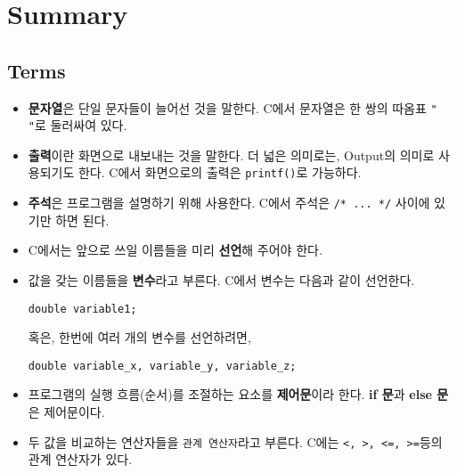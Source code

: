 \documentclass[../main.tex]{subfiles}
\begin{document}
\section{Summary}
\subsection{Terms}
\begin{itemize}
\item \textbf{문자열}은 단일 문자들이 늘어선 것을 말한다. C에서
  문자열은 한 쌍의 따옴표 \texttt{" "}로 둘러싸여 있다.
\item \textbf{출력}이란 화면으로 내보내는 것을 말한다. 더 넓은
  의미로는, Output의 의미로 사용되기도 한다. C에서 화면으로의 출력은
  \texttt{printf()}로 가능하다.
\item \textbf{주석}은 프로그램을 설명하기 위해 사용한다. C에서 주석은
  \texttt{/* ... */} 사이에 있기만 하면 된다.
\item C에서는 앞으로 쓰일 이름들을 미리 \textbf{선언}해 주어야 한다.
\item 값을 갖는 이름들을 \textbf{변수}라고 부른다. C에서 변수는 다음과
  같이 선언한다.
\begin{verbatim}
double variable1;
\end{verbatim}
  혹은, 한번에 여러 개의 변수를 선언하려면,
\begin{verbatim}
double variable_x, variable_y, variable_z;
\end{verbatim}
\item 프로그램의 실행 흐름(순서)를 조절하는 요소를 \textbf{제어문}이라
  한다. \textbf{if 문}과 \textbf{else 문}은 제어문이다.
\item 두 값을 비교하는 연산자들을 \texttt{관계 연산자}라고
  부른다. C에는 \verb|<, >, <=, >=|등의 관계 연산자가 있다.
\end{itemize}
\end{document}
